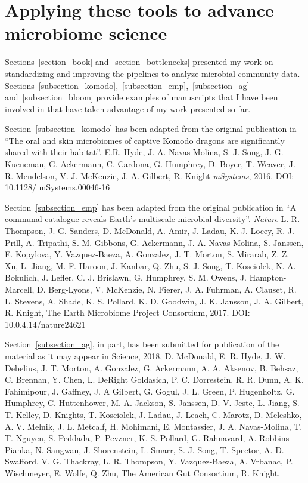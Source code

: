 \section{Applying these tools to advance microbiome science}\label{section_contributions}

Sections~\ref{section_book} and~\ref{section_bottlenecks} presented my work
on standardizing and improving the pipelines to analyze microbial community data.
Sections~\ref{subsection_komodo},~\ref{subsection_emp},~\ref{subsection_ag}
and~\ref{subsection_bloom} provide examples of manuscripts that I have been
involved in that have taken advantage of my work presented so far.

Section~\ref{subsection_komodo} has been adapted from the original publication in
``The oral and skin microbiomes of captive Komodo dragons are significantly shared
with their habitat''. E.R. Hyde, J. A. Navas-Molina, S. J. Song, J. G. Kueneman,
G. Ackermann, C. Cardona, G. Humphrey, D. Boyer, T. Weaver, J. R. Mendelson,
V. J. McKenzie, J. A. Gilbert, R. Knight \emph{mSystems}, 2016. DOI: 10.1128/ mSystems.00046-16

Section~\ref{subsection_emp} has been adapted from the original publication in
``A communal catalogue reveals Earth's multiscale microbial diversity''.
\emph{Nature} L. R. Thompson, J. G. Sanders, D. McDonald, A. Amir,
J. Ladau, K. J. Locey, R. J. Prill, A. Tripathi, S. M. Gibbons, G. Ackermann,
J. A. Navas-Molina, S. Janssen, E. Kopylova, Y. Vazquez-Baeza, A. Gonzalez,
J. T. Morton, S. Mirarab, Z. Z. Xu, L. Jiang, M. F. Haroon, J. Kanbar, Q. Zhu,
S. J. Song, T. Kosciolek, N. A. Bokulich, J. Lefler, C. J. Brislawn, G. Humphrey,
S. M. Owens, J. Hampton-Marcell, D. Berg-Lyons, V. McKenzie, N. Fierer, J. A. Fuhrman,
A. Clauset, R. L. Stevens, A. Shade, K. S. Pollard, K. D. Goodwin, J. K. Jansson,
J. A. Gilbert, R. Knight, The Earth Microbiome Project Consortium, 2017. DOI: 10.0.4.14/nature24621

Section~\ref{subsection_ag}, in part, has been submitted for publication of the
material as it may appear in Science, 2018, D. McDonald, E. R. Hyde, J. W. Debelius,
J. T. Morton, A. Gonzalez, G. Ackermann, A. A. Aksenov, B. Behsaz, C. Brennan,
Y. Chen, L. DeRight Goldasich, P. C. Dorrestein, R. R. Dunn, A. K. Fahimipour,
J. Gaffney, J. A Gilbert, G. Gogul, J. L. Green, P. Hugenholtz, G. Humphrey,
C. Huttenhower, M. A. Jackson, S. Janssen, D. V. Jeste, L. Jiang, S. T. Kelley,
D. Knights, T. Kosciolek, J. Ladau, J. Leach, C. Marotz, D. Meleshko, A. V. Melnik,
J. L. Metcalf, H. Mohimani, E. Montassier, J. A. Navas-Molina, T. T. Nguyen,
S. Peddada, P. Pevzner, K. S. Pollard, G. Rahnavard, A. Robbins-Pianka,
N. Sangwan, J. Shorenstein, L. Smarr, S. J. Song, T. Spector, A. D. Swafford,
V. G. Thackray, L. R. Thompson, Y. Vazquez-Baeza, A. Vrbanac, P. Wischmeyer,
E. Wolfe, Q. Zhu, The American Gut Consortium, R. Knight.

